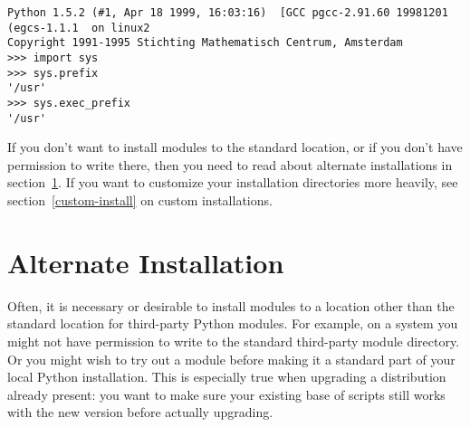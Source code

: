 \documentclass{howto}
\begin{document}
\begin{verbatim}
Python 1.5.2 (#1, Apr 18 1999, 16:03:16)  [GCC pgcc-2.91.60 19981201 (egcs-1.1.1  on linux2
Copyright 1991-1995 Stichting Mathematisch Centrum, Amsterdam
>>> import sys
>>> sys.prefix
'/usr'
>>> sys.exec_prefix
'/usr'
\end{verbatim}

If you don't want to install modules to the standard location, or if you
don't have permission to write there, then you need to read about
alternate installations in section~\ref{alt-install}.  If you want to
customize your installation directories more heavily, see
section~\ref{custom-install} on custom installations.



\newcommand{\installscheme}[8]
  {\begin{tableiii}{l|l|l}{textrm}
          {Type of file}
          {Installation Directory}
          {Override option}
     \lineiii{pure module distribution}
             {\filevar{#1}\filenq{#2}}
             {\longprogramopt{install-purelib}}
     \lineiii{non-pure module distribution}
             {\filevar{#3}\filenq{#4}}
             {\longprogramopt{install-platlib}}
     \lineiii{scripts}
             {\filevar{#5}\filenq{#6}}
             {\longprogramopt{install-scripts}}
     \lineiii{data}
             {\filevar{#7}\filenq{#8}}
             {\longprogramopt{install-data}}
   \end{tableiii}}


\section{Alternate Installation}
\label{alt-install}

Often, it is necessary or desirable to install modules to a location
other than the standard location for third-party Python modules.  For
example, on a \UNIX{} system you might not have permission to write to the
standard third-party module directory.  Or you might wish to try out a
module before making it a standard part of your local Python
installation.  This is especially true when upgrading a distribution
already present: you want to make sure your existing base of scripts
still works with the new version before actually upgrading.
\end{document}
